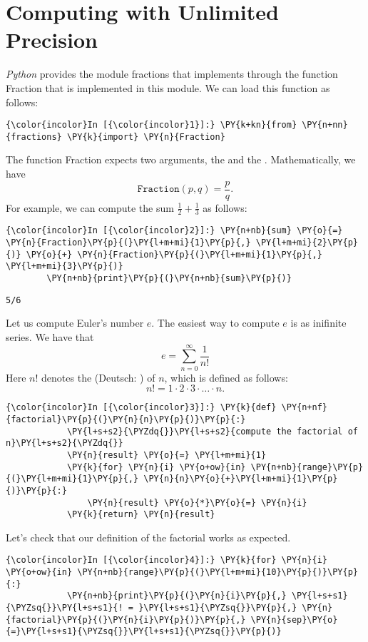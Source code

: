 \section{Computing with Unlimited Precision}
\textsl{Python} provides the module fractions that implements
 through the function Fraction that is
implemented in this module. We can load this function as follows:
\begin{Verbatim}[commandchars=\\\{\}]
{\color{incolor}In [{\color{incolor}1}]:} \PY{k+kn}{from} \PY{n+nn}{fractions} \PY{k}{import} \PY{n}{Fraction}
\end{Verbatim}
The function Fraction expects two arguments, the  and
the . Mathematically, we have
\[ \texttt{Fraction}(p, q) = \frac{p}{q}. \] For example, we can compute
the sum \(\frac{1}{2} + \frac{1}{3}\) as follows:
\begin{Verbatim}[commandchars=\\\{\}]
{\color{incolor}In [{\color{incolor}2}]:} \PY{n+nb}{sum} \PY{o}{=} \PY{n}{Fraction}\PY{p}{(}\PY{l+m+mi}{1}\PY{p}{,} \PY{l+m+mi}{2}\PY{p}{)} \PY{o}{+} \PY{n}{Fraction}\PY{p}{(}\PY{l+m+mi}{1}\PY{p}{,} \PY{l+m+mi}{3}\PY{p}{)}
        \PY{n+nb}{print}\PY{p}{(}\PY{n+nb}{sum}\PY{p}{)}
\end{Verbatim}


\begin{Verbatim}[commandchars=\\\{\}]
5/6
\end{Verbatim}
Let us compute Euler's number \(e\).  The easiest way to compute \(e\) is
as inifinite series. We have that
\[ e = \sum\limits_{n=0}^\infty \frac{1}{n!} \] Here \(n!\) denotes the
 (Deutsch: )  of \(n\), which is defined as follows:
\[ n! = 1 \cdot 2 \cdot 3 \cdot {\dots} \cdot n. \]
\begin{Verbatim}[commandchars=\\\{\}]
{\color{incolor}In [{\color{incolor}3}]:} \PY{k}{def} \PY{n+nf}{factorial}\PY{p}{(}\PY{n}{n}\PY{p}{)}\PY{p}{:}
            \PY{l+s+s2}{\PYZdq{}}\PY{l+s+s2}{compute the factorial of n}\PY{l+s+s2}{\PYZdq{}}
            \PY{n}{result} \PY{o}{=} \PY{l+m+mi}{1}
            \PY{k}{for} \PY{n}{i} \PY{o+ow}{in} \PY{n+nb}{range}\PY{p}{(}\PY{l+m+mi}{1}\PY{p}{,} \PY{n}{n}\PY{o}{+}\PY{l+m+mi}{1}\PY{p}{)}\PY{p}{:}
                \PY{n}{result} \PY{o}{*}\PY{o}{=} \PY{n}{i}
            \PY{k}{return} \PY{n}{result}
\end{Verbatim}
Let's check that our definition of the factorial works as expected.
\begin{Verbatim}[commandchars=\\\{\}]
{\color{incolor}In [{\color{incolor}4}]:} \PY{k}{for} \PY{n}{i} \PY{o+ow}{in} \PY{n+nb}{range}\PY{p}{(}\PY{l+m+mi}{10}\PY{p}{)}\PY{p}{:}
            \PY{n+nb}{print}\PY{p}{(}\PY{n}{i}\PY{p}{,} \PY{l+s+s1}{\PYZsq{}}\PY{l+s+s1}{! = }\PY{l+s+s1}{\PYZsq{}}\PY{p}{,} \PY{n}{factorial}\PY{p}{(}\PY{n}{i}\PY{p}{)}\PY{p}{,} \PY{n}{sep}\PY{o}{=}\PY{l+s+s1}{\PYZsq{}}\PY{l+s+s1}{\PYZsq{}}\PY{p}{)}
\end{Verbatim}

